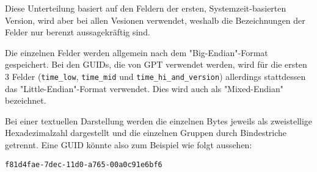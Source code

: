 Diese Unterteilung basiert auf den Feldern der ersten, Systemzeit-basierten Version, wird aber bei allen Vesionen verwendet, weshalb die Bezeichnungen der Felder nur berenzt aussagekräftig sind.\cite{uuid-rfc}

Die einzelnen Felder werden allgemein nach dem "Big-Endian"-Format gespeichert.
Bei den GUIDs, die von GPT verwendet werden, wird für die ersten 3 Felder (\texttt{time\_low}, \texttt{time\_mid} und \texttt{time\_hi\_and\_version}) allerdings stattdessen das "Little-Endian"-Format verwendet.\cite{uefi-spec}
Dies wird auch als "Mixed-Endian" bezeichnet.

Bei einer textuellen Darstellung werden die einzelnen Bytes jeweils als zweistellige Hexadezimalzahl dargestellt und die einzelnen Gruppen durch Bindestriche getrennt.
Eine GUID könnte also zum Beispiel wie folgt aussehen:

\vspace{-0.5cm}

\begin{center}
    \texttt{f81d4fae-7dec-11d0-a765-00a0c91e6bf6}
\end{center}
